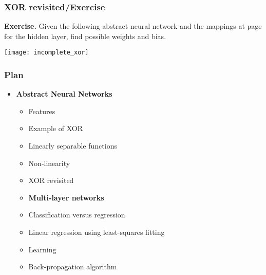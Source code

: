 %
\begin{frame}
\frametitle{XOR revisited/Exercise}

\textbf{Exercise.} Given the following abstract neural network and the
mappings at page \pageref{xor} for the hidden layer, find possible
weights and bias.
\begin{center}
\texttt{[image: incomplete\_xor]}
\end{center}

\end{frame}

%
\begin{frame}
\frametitle{Plan}

\begin{itemize}

  \item \textbf{Abstract Neural Networks}

  \begin{itemize}

    \item Features

    \item Example of XOR

    \item Linearly separable functions

    \item Non-linearity

    \item XOR revisited

    \item \textbf{Multi-layer networks}

    \item Classification versus regression

    \item Linear regression using least-squares fitting

    \item Learning

    \item Back-propagation algorithm

  \end{itemize}

\end{itemize}

\end{frame}


